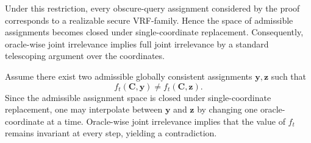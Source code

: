 \documentclass[11pt]{article}
\begin{document}
Under this restriction, every obscure-query assignment considered by
the proof corresponds to a realizable secure VRF-family. Hence the
space of admissible assignments becomes closed under single-coordinate
replacement. Consequently, oracle-wise joint irrelevance implies full
joint irrelevance by a standard telescoping argument over the
coordinates.

Assume there exist two admissible globally consistent assignments
$\mathbf y,\mathbf z$ such that
\[
f_t(\mathbf C,\mathbf y) \neq f_t(\mathbf C,\mathbf z).
\]
Since the admissible assignment space is closed under
single-coordinate replacement, one may interpolate between
$\mathbf y$ and $\mathbf z$ by changing one oracle-coordinate at a
time. Oracle-wise joint irrelevance implies that the value of $f_t$
remains invariant at every step, yielding a contradiction.
\end{document}
